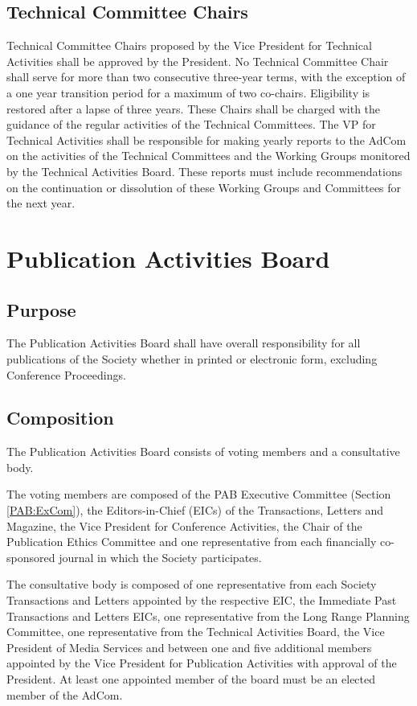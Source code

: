 \documentclass[10pt]{article}
\newcommand{\secref}[1]{Section \ref{#1}}
\begin{document}
\subsection{Technical Committee Chairs}

Technical Committee Chairs proposed by the Vice President for Technical Activities shall be approved by the President. No Technical Committee Chair shall serve for more than two consecutive three-year terms, with the exception of a one year transition period for a maximum of two co-chairs. Eligibility is restored after a lapse of three years. These Chairs shall be charged with the guidance of the regular activities of the Technical Committees. The VP for Technical Activities shall be responsible for making yearly reports to the AdCom on the activities of the Technical Committees and the Working Groups monitored by the Technical Activities Board. These reports must include recommendations on the continuation or dissolution of these Working Groups and Committees for the next year.


\section{Publication Activities Board}
\label{PAB}

\subsection{Purpose}
The Publication Activities Board shall have overall responsibility for all publications of the Society whether in printed or electronic form, excluding Conference Proceedings.  




\subsection{Composition}

The Publication Activities Board consists of voting members and a consultative body. 

The voting members are composed of the PAB Executive Committee (\secref{PAB:ExCom}), the Editors-in-Chief (EICs) of the Transactions, Letters and Magazine, the Vice President for Conference Activities, the Chair of the Publication Ethics Committee and one representative from each financially co-sponsored journal in which the Society participates. 

The consultative body is composed of one representative from each Society Transactions and Letters appointed by the respective EIC, the Immediate Past Transactions and Letters EICs, one representative from the Long Range Planning Committee, one representative from the Technical Activities Board, the Vice President of Media Services and between one and five additional  members appointed by the Vice President for Publication Activities with approval of the President. At least one appointed member of the board must be an elected member of the AdCom.
\end{document}
